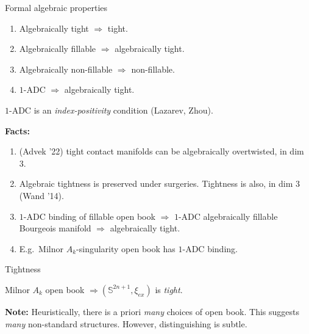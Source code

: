 \documentclass{beamer}
\begin{document}
\begin{frame}{Formal algebraic properties}

\begin{lemma}
    \begin{enumerate}
        \item Algebraically tight $\Rightarrow$ tight.
        \item Algebraically fillable $\Rightarrow$ algebraically tight.
        \item Algebraically non-fillable $\Rightarrow$ non-fillable.
        \item $1$-ADC $\Rightarrow$ algebraically tight.
    \end{enumerate}
\end{lemma}

$1$-ADC is an \emph{index-positivity} condition (Lazarev, Zhou).


\medskip

\pause

\textbf{Facts:} \begin{enumerate}
    \item (Advek '22) tight contact manifolds can be algebraically overtwisted, in dim 3.
    \item Algebraic tightness is preserved under surgeries. Tightness is also, in dim $3$ (Wand '14).
    \item $1$-ADC binding of fillable open book $\Rightarrow$ $1$-ADC algebraically fillable Bourgeois manifold $\Rightarrow$ algebraically tight. 
    \item E.g.\ Milnor $A_k$-singularity open book has $1$-ADC binding.
\end{enumerate}

\end{frame}

\begin{frame}{Tightness}

\begin{tcolorbox}
Milnor $A_k$ open book $\Rightarrow (\mathbb S^{2n+1},\xi_{ex})$ is \emph{tight}.
\end{tcolorbox}

\pause

\begin{tcolorbox}
\textbf{Note:} Heuristically, there is a priori \emph{many} choices of open book. This suggests \emph{many} non-standard structures. However, distinguishing is subtle.
\end{tcolorbox}

\end{frame}
\end{document}
